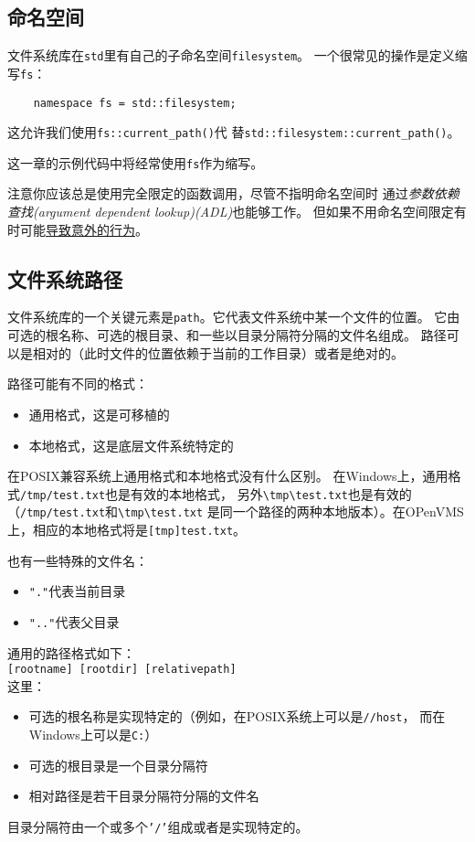 \subsection{命名空间}
文件系统库在\texttt{std}里有自己的子命名空间\texttt{filesystem}。
一个很常见的操作是定义缩写\texttt{fs}：
\begin{lstlisting}
    namespace fs = std::filesystem;
\end{lstlisting}
这允许我们使用\texttt{fs::current\_path()}代
替\texttt{std::filesystem::current\_path()}。

这一章的示例代码中将经常使用\texttt{fs}作为缩写。

注意你应该总是使用完全限定的函数调用，尽管不指明命名空间时
通过\emph{参数依赖查找(argument dependent lookup)(ADL)}也能够工作。
但如果不用命名空间限定有时可能\hyperref[ADL导致意外行为]{导致意外的行为}。

\subsection{文件系统路径}\label{ch20.2.3}
文件系统库的一个关键元素是\texttt{path}。它代表文件系统中某一个文件的位置。
它由可选的根名称、可选的根目录、和一些以目录分隔符分隔的文件名组成。
路径可以是相对的（此时文件的位置依赖于当前的工作目录）或者是绝对的。

路径可能有不同的格式：
\begin{itemize}
    \item 通用格式，这是可移植的
    \item 本地格式，这是底层文件系统特定的
\end{itemize}
在POSIX兼容系统上通用格式和本地格式没有什么区别。
在Windows上，通用格式\texttt{/tmp/test.txt}也是有效的本地格式，
另外\texttt{\textbackslash tmp\textbackslash test.txt}也是有效的
（\texttt{/tmp/test.txt}和\texttt{\textbackslash tmp\textbackslash test.txt}
是同一个路径的两种本地版本）。在OPenVMS上，相应的本地格式将是\texttt{[tmp]test.txt}。

也有一些特殊的文件名：
\begin{itemize}
    \item \texttt{"."}代表当前目录
    \item \texttt{".."}代表父目录
\end{itemize}
通用的路径格式如下：\\
\hspace*{2em}\texttt{[rootname] [rootdir] [relativepath]}\\
这里：
\begin{itemize}
    \item 可选的根名称是实现特定的（例如，在POSIX系统上可以是\texttt{//host}，
    而在Windows上可以是\texttt{C:}）
    \item 可选的根目录是一个目录分隔符
    \item 相对路径是若干目录分隔符分隔的文件名
\end{itemize}
目录分隔符由一个或多个\texttt{'/'}组成或者是实现特定的。

